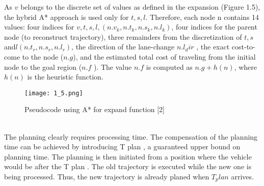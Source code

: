\documentclass{report}
\begin{document}
\indent
As $v$ belongs to the discrete set of values as defined in the expansion (Figure 1.5), the hybrid A* approach is used only for $t, s, l$. Therefore, each node n contains 14 values: four indices for $v, t, s, l, (n.v_k , n.t_k , n.s_k , n.l_k )$, four indices for the parent node (to reconstruct trajectory), three remainders from the discretization of $t, s$ and$ l (n.t_r , n.s_r , n.l_r )$, the direction of the lane-change $n.l_dir$ , the exact
cost-to-come to the node ($n.g$), and the estimated total cost of traveling from the initial node to the goal region ($n.f$ ). The value $n.f$ is computed as $n.g + h(n)$, where $h(n)$ is the heuristic function.
   \begin{figure}[ht]
	\centering
	\texttt{[image: 1\_5.png]}
	\caption{Pseudocode using A* for expand function
		[2]}
	\label{fig:1.5} 
\end{figure}\\
\indent
The planning clearly requires processing time. The compensation of the planning time can be achieved by introducing T plan , a guaranteed upper bound on planning time. The planning is then initiated from a position where the vehicle would be after the T plan . The old trajectory is executed while the new one is being processed. Thus, the new trajectory is already planed when $T_ plan$ arrives.
\end{document}
